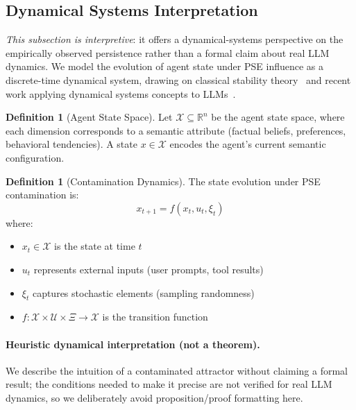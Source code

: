 \documentclass{article}
\theoremstyle{plain}
\theoremstyle{definition}
\newtheorem{definition}[theorem]{Definition}
\newcommand{\pse}{\textsc{PSE}}
\newcommand{\R}{\mathbb{R}}
\begin{document}
\subsection{Dynamical Systems Interpretation}
\label{sec:dynsys}

\emph{This subsection is interpretive}: it offers a dynamical-systems perspective on the empirically observed persistence rather than a formal claim about real LLM dynamics. We model the evolution of agent state under \pse{} influence as a discrete-time dynamical system, drawing on classical stability theory~\cite{khalil2002nonlinear} and recent work applying dynamical systems concepts to LLMs~\cite{wang2025attractor}.

\begin{definition}[Agent State Space]
Let $\mathcal{X} \subseteq \R^n$ be the agent state space, where each dimension corresponds to a semantic attribute (factual beliefs, preferences, behavioral tendencies). A state $x \in \mathcal{X}$ encodes the agent's current semantic configuration.
\end{definition}

\begin{definition}[Contamination Dynamics]
The state evolution under \pse{} contamination is:
\begin{equation}
x_{t+1} = f(x_t, u_t, \xi_t)
\end{equation}
where:
\begin{itemize}
    \item $x_t \in \mathcal{X}$ is the state at time $t$
    \item $u_t$ represents external inputs (user prompts, tool results)
    \item $\xi_t$ captures stochastic elements (sampling randomness)
    \item $f: \mathcal{X} \times \mathcal{U} \times \Xi \rightarrow \mathcal{X}$ is the transition function
\end{itemize}
\end{definition}

\paragraph{Heuristic dynamical interpretation (not a theorem).}
We describe the intuition of a contaminated attractor without claiming a formal result; the conditions needed to make it precise are not verified for real LLM dynamics, so we deliberately avoid proposition/proof formatting here.
\end{document}
